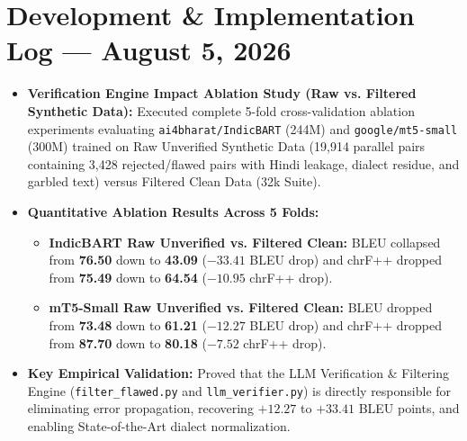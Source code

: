 \documentclass[10pt]{article}
\begin{document}
\section*{Development \& Implementation Log --- August 5, 2026}

\begin{itemize}
  \item \textbf{Verification Engine Impact Ablation Study (Raw vs. Filtered Synthetic Data):} Executed complete 5-fold cross-validation ablation experiments evaluating \texttt{ai4bharat/IndicBART} (244M) and \texttt{google/mt5-small} (300M) trained on Raw Unverified Synthetic Data (19,914 parallel pairs containing 3,428 rejected/flawed pairs with Hindi leakage, dialect residue, and garbled text) versus Filtered Clean Data (32k Suite).
  \item \textbf{Quantitative Ablation Results Across 5 Folds:}
    \begin{itemize}
      \item \textbf{IndicBART Raw Unverified vs. Filtered Clean:} BLEU collapsed from \textbf{76.50} down to \textbf{43.09} ($-33.41$ BLEU drop) and chrF++ dropped from \textbf{75.49} down to \textbf{64.54} ($-10.95$ chrF++ drop).
      \item \textbf{mT5-Small Raw Unverified vs. Filtered Clean:} BLEU dropped from \textbf{73.48} down to \textbf{61.21} ($-12.27$ BLEU drop) and chrF++ dropped from \textbf{87.70} down to \textbf{80.18} ($-7.52$ chrF++ drop).
    \end{itemize}
  \item \textbf{Key Empirical Validation:} Proved that the LLM Verification \& Filtering Engine (\texttt{filter\_flawed.py} and \texttt{llm\_verifier.py}) is directly responsible for eliminating error propagation, recovering $+12.27$ to $+33.41$ BLEU points, and enabling State-of-the-Art dialect normalization.
\end{itemize}
\end{document}
